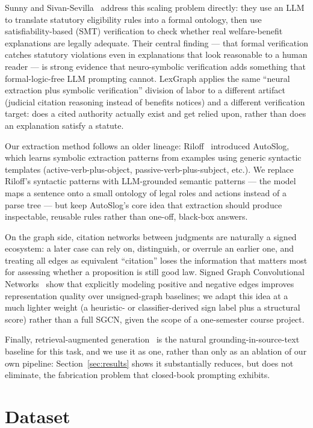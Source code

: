 \documentclass[10pt,conference]{IEEEtran}
\begin{document}
Sunny and Sivan-Sevilla~\cite{sunny2026} address this scaling problem directly: they use
an LLM to translate statutory eligibility rules into a formal ontology, then use
satisfiability-based (SMT) verification to check whether real welfare-benefit
explanations are legally adequate. Their central finding --- that formal verification
catches statutory violations even in explanations that look reasonable to a human reader
--- is strong evidence that neuro-symbolic verification adds something that
formal-logic-free LLM prompting cannot. LexGraph applies the same ``neural extraction plus
symbolic verification'' division of labor to a different artifact (judicial citation
reasoning instead of benefits notices) and a different verification target: does a cited
authority actually exist and get relied upon, rather than does an explanation satisfy a
statute.

Our extraction method follows an older lineage: Riloff~\cite{riloff1993} introduced
AutoSlog, which learns symbolic extraction patterns from examples using generic syntactic
templates (active-verb-plus-object, passive-verb-plus-subject, etc.). We replace Riloff's
syntactic patterns with LLM-grounded semantic patterns --- the model maps a sentence onto
a small ontology of legal roles and actions instead of a parse tree --- but keep
AutoSlog's core idea that extraction should produce inspectable, reusable rules rather
than one-off, black-box answers.

On the graph side, citation networks between judgments are naturally a signed ecosystem: a
later case can rely on, distinguish, or overrule an earlier one, and treating all edges as
equivalent ``citation'' loses the information that matters most for assessing whether a
proposition is still good law. Signed Graph Convolutional Networks~\cite{derr2018} show
that explicitly modeling positive and negative edges improves representation quality over
unsigned-graph baselines; we adapt this idea at a much lighter weight (a heuristic- or
classifier-derived sign label plus a structural score) rather than a full SGCN, given the
scope of a one-semester course project.

Finally, retrieval-augmented generation~\cite{lewis2020} is the natural
grounding-in-source-text baseline for this task, and we use it as one, rather than only
as an ablation of our own pipeline: Section~\ref{sec:results} shows it substantially
reduces, but does not eliminate, the fabrication problem that closed-book prompting
exhibits.

\section{Dataset}
\label{sec:dataset}
\end{document}
